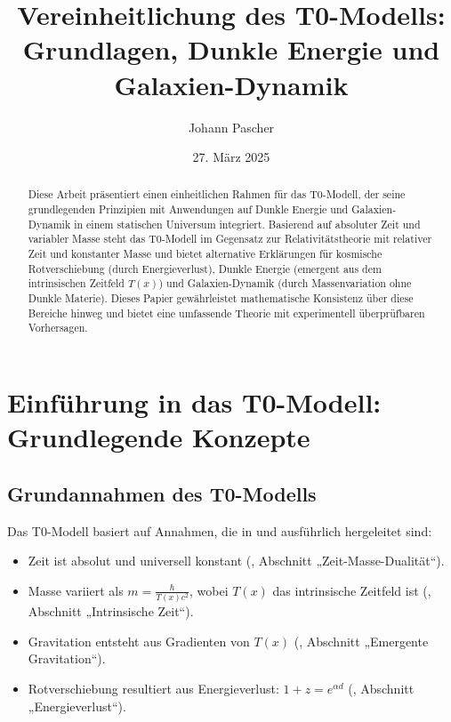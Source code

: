\documentclass[a4paper,12pt]{article}
\theoremstyle{definition}
\theoremstyle{remark}
\newcommand{\Tfield}{T(x)}
\begin{document}
	
	\title{Vereinheitlichung des T0-Modells: \\ Grundlagen, Dunkle Energie und Galaxien-Dynamik}
	\author{Johann Pascher}
	\date{27. März 2025}
	\maketitle
	
	\begin{abstract}
		Diese Arbeit präsentiert einen einheitlichen Rahmen für das T0-Modell, der seine grundlegenden Prinzipien mit Anwendungen auf Dunkle Energie und Galaxien-Dynamik in einem statischen Universum integriert. Basierend auf absoluter Zeit und variabler Masse steht das T0-Modell im Gegensatz zur Relativitätstheorie mit relativer Zeit und konstanter Masse und bietet alternative Erklärungen für kosmische Rotverschiebung (durch Energieverlust), Dunkle Energie (emergent aus dem intrinsischen Zeitfeld \(\Tfield\)) und Galaxien-Dynamik (durch Massenvariation ohne Dunkle Materie). Dieses Papier gewährleistet mathematische Konsistenz über diese Bereiche hinweg und bietet eine umfassende Theorie mit experimentell überprüfbaren Vorhersagen.
	\end{abstract}
	
	\tableofcontents
	\newpage
	
	\section{Einführung in das T0-Modell: Grundlegende Konzepte}
	
	\subsection{Grundannahmen des T0-Modells}
	
	Das T0-Modell basiert auf Annahmen, die in \cite{pascher_params_2025} und \cite{pascher_galaxies_2025} ausführlich hergeleitet sind:
	
	\begin{tcolorbox}[colback=blue!5!white,colframe=blue!75!black,title=Grundannahmen des T0-Modells]
		\begin{itemize}
			\item Zeit ist absolut und universell konstant (\cite{pascher_params_2025}, Abschnitt „Zeit-Masse-Dualität“).
			\item Masse variiert als \(m = \frac{\hbar}{\Tfield c^2}\), wobei \(\Tfield\) das intrinsische Zeitfeld ist (\cite{pascher_params_2025}, Abschnitt „Intrinsische Zeit“).
			\item Gravitation entsteht aus Gradienten von \(\Tfield\) (\cite{pascher_galaxies_2025}, Abschnitt „Emergente Gravitation“).
			\item Rotverschiebung resultiert aus Energieverlust: \(1 + z = e^{\alpha d}\) (\cite{pascher_messdifferenzen_2025}, Abschnitt „Energieverlust“).
		\end{itemize}
	\end{tcolorbox}
	
\end{document}
